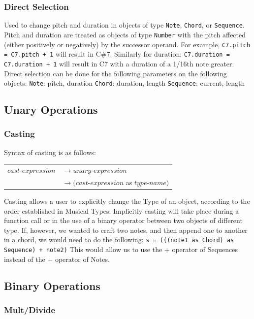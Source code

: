 \documentclass[12pt,A4]{book}
\begin{document}
\subsubsection{Direct Selection}
Used to change pitch and duration in objects of type \verb|Note|, \verb|Chord|, or \verb|Sequence|. Pitch and duration are treated as objects of type  \verb|Number| with the pitch affected (either positively or negatively) by the successor operand. For example, \verb|C7.pitch = C7.pitch + 1| will result in C\#7.
Similarly for duration: \verb|C7.duration = C7.duration + 1| will result in C7 with a duration of a 1/16th note greater.
Direct selection can be done for the following parameters on the following objects:
\verb|Note|: pitch, duration
\verb|Chord|: duration, length
\verb|Sequence|: current, length

\subsection{Unary Operations}
\subsubsection{Casting}
Syntax of casting is as follows:

\begin{tabular}{l l}
$cast\mbox{-}expression$  & $\rightarrow unary\mbox{-}expression$ \\
& $\rightarrow (cast\mbox{-}expression$ as $type\mbox{-}name)$ 
\end{tabular}

Casting allows a user to explicitly change the Type of an object, according to the order established in Musical Types. Implicitly casting will take place during a function call or in the use of a binary operator between two objects of different type. If, however, we wanted to craft two notes, and then append one to another in a chord, we would need to do the following:
\verb|s = (((note1 as Chord) as Sequence) + note2)|
This would allow us to use the + operator of Sequences instead of the + operator of Notes.
\subsection{Binary Operations}


\subsubsection{Mult/Divide}
\end{document}
